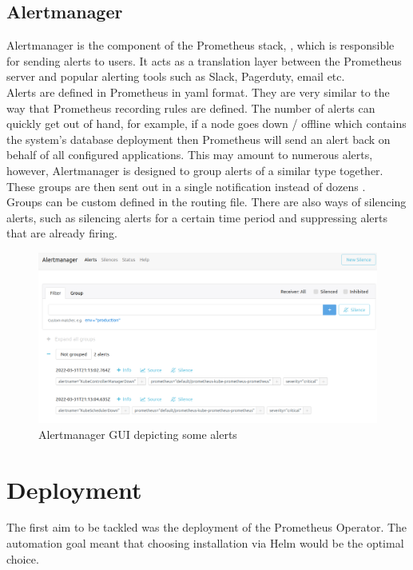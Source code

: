 \subsection{Alertmanager}
Alertmanager is the component of the Prometheus stack, , which is responsible for sending alerts to users. It acts as
a translation layer between the Prometheus server and popular alerting tools such as Slack, Pagerduty, email etc.\\
Alerts are defined in Prometheus in yaml format. They are very similar to the way that Prometheus recording rules are defined.
\bigbreak
The number of alerts can quickly get out of hand, for example, if a node goes down / offline which contains the system's database deployment
then Prometheus will send an alert back on behalf of all configured applications. This may amount to numerous alerts, however, Alertmanager
is designed to group alerts of a similar type together. These groups are then sent out in a single notification instead of dozens
\autocite{prometheusAlertmanagerPrometheus}. \\
Groups can be custom defined in the routing file. There are also ways of silencing alerts, such as silencing alerts for a certain time period and
suppressing alerts that are already firing.
\begin{figure}[H]
	\centering
	\includegraphics[width=1\linewidth]{figures/alertmanager_gui.png}
	\caption{Alertmanager GUI depicting some alerts}
	\label{fig:alertmanager_gui}
\end{figure}

\section{Deployment}
\label{sec:deployment}
The first aim to be tackled was the deployment of the Prometheus Operator. The automation goal meant that choosing installation via Helm would be
the optimal choice.
